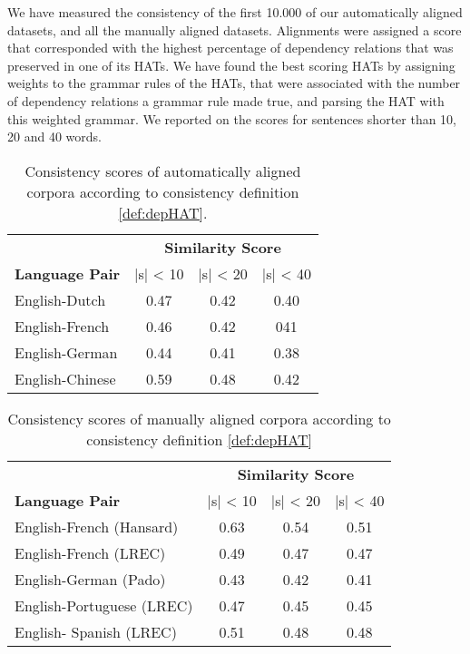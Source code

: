 \documentclass[hidelinks]{report}
\begin{document}
We have measured the consistency of the first 10.000 of our automatically aligned datasets, and all the manually aligned datasets. Alignments were assigned a score that corresponded with the highest percentage of dependency relations that was preserved in one of its HATs. We have found the best scoring HATs by assigning weights to the grammar rules of the HATs, that were associated with the number of dependency relations a grammar rule made true, and parsing the HAT with this weighted grammar. We reported on the scores for sentences shorter than 10, 20 and 40 words.

\begin{table}[!ht]
\centering
\begin{tabular}{|l|c|c|c|}
\hline
&\multicolumn{3}{c|}{\textbf{Similarity Score}}\\
\textbf{Language Pair} & |s| < 10 & |s| < 20 & |s| < 40\\
\hline \hline
English-Dutch & 0.47 & 0.42 & 0.40 \\
\hline
English-French & 0.46 & 0.42 & 041 \\
\hline
English-German & 0.44 & 0.41 & 0.38 \\
\hline
English-Chinese & 0.59 & 0.48 & 0.42\\
\hline
\end{tabular}
\caption{Consistency scores of automatically aligned corpora according to consistency definition \ref{def:depHAT}.}\label{tab:scores1}
\end{table}

\begin{table}[!ht]
\centering
\begin{tabular}{|l|c|c|c|}
\hline
&\multicolumn{3}{c|}{\textbf{Similarity Score}}\\
\textbf{Language Pair} & |s| < 10 & |s| < 20 & |s| < 40\\
\hline \hline
English-French (Hansard) & 0.63 & 0.54 & 0.51 \\
\hline
English-French (LREC) & 0.49 & 0.47 & 0.47 \\
\hline
English-German (Pado) & 0.43 & 0.42 & 0.41 \\
\hline
English-Portuguese (LREC) & 0.47 & 0.45 & 0.45 \\
\hline
English- Spanish (LREC) & 0.51 & 0.48 & 0.48\\
\hline
\end{tabular}
\caption{Consistency scores of manually aligned corpora according to consistency definition \ref{def:depHAT}}\label{tab:scores2}
\end{table}
\end{document}
